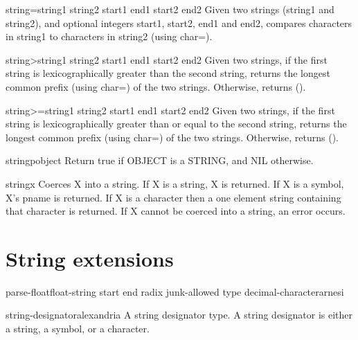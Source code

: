 \begin{function}{string=}{string1 string2 \key start1 end1 start2 end2}{}{}
  Given two strings (string1 and string2), and optional integers start1,
  start2, end1 and end2, compares characters in string1 to characters in
  string2 (using char=).
\end{function}

\begin{function}{string>}{string1 string2 \key start1 end1 start2 end2}{}{}
  Given two strings, if the first string is lexicographically greater than
  the second string, returns the longest common prefix (using char=)
  of the two strings. Otherwise, returns ().
\end{function}

\begin{function}{string>=}{string1 string2 \key start1 end1 start2 end2}{}{}
  Given two strings, if the first string is lexicographically greater
  than or equal to the second string, returns the longest common prefix
  (using char=) of the two strings. Otherwise, returns ().
\end{function}

\begin{function}{stringp}{object}{}{}
  Return true if OBJECT is a STRING, and NIL otherwise.
\end{function}

\begin{class}{string}{x}{}{}
  Coerces X into a string. If X is a string, X is returned. If X is a
   symbol, X's pname is returned. If X is a character then a one element
   string containing that character is returned. If X cannot be coerced
   into a string, an error occurs.
\end{class}

\section{String extensions}
\label{sec:string-extensions}

\begin{function}{parse-float}{float-string \key start end radix junk-allowed type decimal-character}{arnesi}{}
\end{function}

\begin{type}{string-designator}{}{alexandria}{}
  A string designator type. A string designator is either a string, a
  symbol, or a character.
\end{type}

